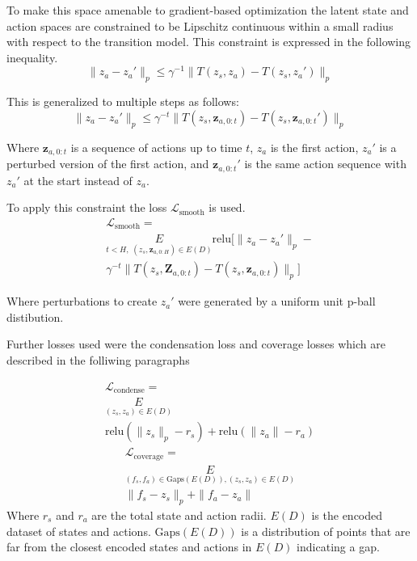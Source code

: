 \documentclass[12pt, twocolumn]{article}
\begin{document}
To make this space amenable to gradient-based optimization the latent state and action spaces are constrained to be Lipschitz continuous within a small radius with respect to the transition model.
This constraint is expressed in the following inequality.
\[\|z_a - z_a'\|_p \leq \gamma^{-1} \|T(z_s, z_a) - T(z_s, z_a')\|_p\]

This is generalized to multiple steps as follows:
\[\|z_a - z_a'\|_p \leq \gamma^{-t} \|T(z_s, \mathbf{z}_{a, 0:t}) - T(z_s, \mathbf{z}_{a, 0:t}')\|_p\]

Where \(\mathbf{z}_{a, 0:t}\) is a sequence of actions up to time \(t\), \(z_a\) is the first action, \(z_a'\) is a perturbed version of the first action, and \(\mathbf{z}_{a,0:t}'\) is the same action sequence with \(z_a'\) at the start instead of \(z_a\).

To apply this constraint the loss \(\mathcal{L}_\text{smooth}\) is used.
\begin{multline*}
    \mathcal{L}_\text{smooth} = \\
    \underset{t<H,\;(z_s,\mathbf{z}_{a,0:H})\in E(D)}{E} \text{relu}\!\big[\|z_a - z_a'\|_p - \\
        \gamma^{-t} \|T(z_s, \mathbf{Z}_{a, 0:t}) - T(z_s, \mathbf{z}_{a, 0:t})\|_p \big]
\end{multline*}

Where perturbations to create \(z_a'\) were generated by a uniform unit p-ball distibution.

Further losses used were the condensation loss and coverage losses which are described in the folliwing paragraphs

\begin{multline*}
    \mathcal{L}_\text{condense} = \\
    \underset{(z_s, z_a)\in E(D)}{E} \\
    \text{relu}(\|z_s\|_p - r_s) + \text{relu}(\|z_a\| - r_a)
\end{multline*}
\begin{multline*}
    \mathcal{L}_\text{coverage} = \\
    \underset{(f_s, f_a)\in \text{Gaps}(E(D)), (z_s, z_a) \in E(D)}{E} \\
    \|f_s - z_s\|_p + \|f_a - z_a\|
\end{multline*}
Where \(r_s\) and \(r_a\) are the total state and action radii.
\(E(D)\) is the encoded dataset of states and actions.
\(\text{Gaps}(E(D))\) is a distribution of points that are far from the closest encoded states and actions in \(E(D)\) indicating a gap.
\end{document}
